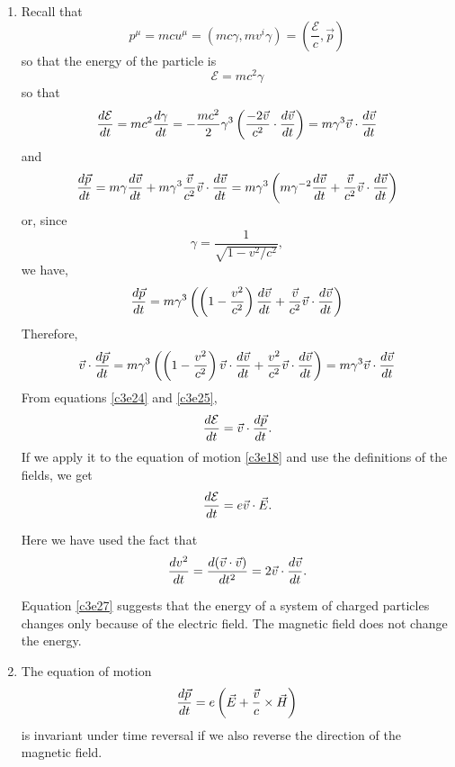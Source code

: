 \begin{enumerate}
\item Recall that 
\begin{equation}\label{c3e22}
p^\mu = mcu^\mu = (mc\gamma, mv^i\gamma) = \left(\frac{\mathcal{E}}{c}, 
\vec{p}\right)
\end{equation}
so that the energy of the particle is
\begin{equation}\label{c3e23}
\mathcal{E} = mc^2\gamma
\end{equation}
so that
\begin{equation}\label{c3e24}
\frac{d{\mathcal{E}}}{d{t}} = mc^2\frac{d{\gamma}}{d{t}} = 
-\frac{mc^2}{2}\gamma^3\left(\frac{-2\vec{v}}{c^2}\cdot\frac{d{\vec{v}}}{d{t}}\right)
= m\gamma^3 \vec{v}\cdot\frac{d{\vec{v}}}{d{t}}
\end{equation}
and
\[
\frac{d{\vec{p}}}{d{t}} = 
m\gamma\frac{d{\vec{v}}}{d{t}} + 
m\gamma^3\frac{\vec{v}}{c^2}\vec{v}\cdot\frac{d{\vec{v}}}{d{t}} = 
m\gamma^3\left(m\gamma^{-2}\frac{d{\vec{v}}}{d{t}} + 
\frac{\vec{v}}{c^2}\vec{v}\cdot\frac{d{\vec{v}}}{d{t}}\right)
\]
or, since
\[
\gamma = \frac{1}{\sqrt{1 - v^2/c^2}},
\]
we have,
\[
\frac{d{\vec{p}}}{d{t}} = m\gamma^3\left(
\left(1 - \frac{v^2}{c^2}\right)\frac{d{\vec{v}}}{d{t}} + 
\frac{\vec{v}}{c^2}\vec{v}\cdot\frac{d{\vec{v}}}{d{t}}\right)
\]
Therefore,
\begin{equation}\label{c3e25}
\vec{v}\cdot\frac{d{\vec{p}}}{d{t}} = 
m\gamma^3\left(\left(1 - \frac{v^2}{c^2}\right)\vec{v}\cdot\frac{d{\vec{v}}}{d{t}} + 
\frac{v^2}{c^2}\vec{v}\cdot\frac{d{\vec{v}}}{d{t}}\right) = 
m\gamma^3\vec{v}\cdot\frac{d{\vec{v}}}{d{t}}
\end{equation}
From equations \eqref{c3e24} and \eqref{c3e25},
\begin{equation}\label{c3e26}
\frac{d{\mathcal{E}}}{d{t}} = \vec{v}\cdot\frac{d{\vec{p}}}{d{t}}.
\end{equation}
If we apply it to the equation of motion \eqref{c3e18} and use the definitions 
of the fields, we get
\begin{equation}\label{c3e27}
\frac{d{\mathcal{E}}}{d{t}} = e\vec{v}\cdot\vec{E}.
\end{equation}

Here we have used the fact that
\begin{equation}\label{c3e28}
\frac{d{v^2}}{d{t}} = \frac{d{(\vec{v}\cdot\vec{v})}}{d{t^2}} = 2\vec{v}\cdot\frac{d{\vec{v}}}{d{t}}.
\end{equation}

Equation \eqref{c3e27} suggests that the energy of a system of charged 
particles changes only because of the electric field. The magnetic field does 
not change the energy.

\item The equation of motion
\begin{equation}\label{c3e29}
\frac{d{\vec{p}}}{d{t}} = e\left(\vec{E} + \frac{\vec{v}}{c}\times\vec{H}\right)
\end{equation}
is invariant under time reversal if we also reverse the direction of the 
magnetic field.


\end{enumerate}
